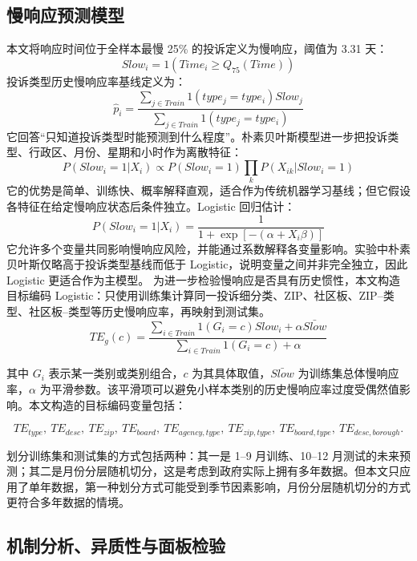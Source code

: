 \documentclass[UTF8,a4paper,12pt]{ctexart}
\begin{document}
\subsection{慢响应预测模型}

本文将响应时间位于全样本最慢 25\% 的投诉定义为慢响应，阈值为 3.31 天：
\begin{equation}
Slow_i=1(Time_i \geq Q_{75}(Time))
\end{equation}
投诉类型历史慢响应率基线定义为：
\begin{equation}
\hat p_i=\frac{\sum_{j\in Train}1(type_j=type_i)Slow_j}{\sum_{j\in Train}1(type_j=type_i)}
\end{equation}
它回答“只知道投诉类型时能预测到什么程度”。朴素贝叶斯模型进一步把投诉类型、行政区、月份、星期和小时作为离散特征：
\begin{equation}
P(Slow_i=1|X_i)\propto P(Slow_i=1)\prod_k P(X_{ik}|Slow_i=1)
\end{equation}
它的优势是简单、训练快、概率解释直观，适合作为传统机器学习基线；但它假设各特征在给定慢响应状态后条件独立。Logistic 回归估计：
\begin{equation}
P(Slow_i=1|X_i)=\frac{1}{1+\exp[-(\alpha+X_i\beta)]}
\end{equation}
它允许多个变量共同影响慢响应风险，并能通过系数解释各变量影响。实验中朴素贝叶斯仅略高于投诉类型基线而低于 Logistic，说明变量之间并非完全独立，因此 Logistic 更适合作为主模型。
为进一步检验慢响应是否具有历史惯性，本文构造目标编码 Logistic：只使用训练集计算同一投诉细分类、ZIP、社区板、ZIP--类型、社区板--类型等历史慢响应率，再映射到测试集。
\begin{equation}
TE_g(c)=
\frac{\sum_{i\in Train}1(G_i=c)Slow_i+\alpha \bar{Slow}}
{\sum_{i\in Train}1(G_i=c)+\alpha}
\end{equation}

其中 \(G_i\) 表示某一类别或类别组合，\(c\) 为其具体取值，\(\bar{Slow}\) 为训练集总体慢响应率，\(\alpha\) 为平滑参数。该平滑项可以避免小样本类别的历史慢响应率过度受偶然值影响。本文构造的目标编码变量包括：

\[
TE_{type},\ TE_{desc},\ TE_{zip},\ TE_{board},\ TE_{agency,type},\ TE_{zip,type},\ TE_{board,type},\ TE_{desc,borough}.
\]


划分训练集和测试集的方式包括两种：其一是 1--9 月训练、10--12 月测试的未来预测；其二是月份分层随机切分，这是考虑到政府实际上拥有多年数据。但本文只应用了单年数据，第一种划分方式可能受到季节因素影响，月份分层随机切分的方式更符合多年数据的情境。

\subsection{机制分析、异质性与面板检验}
\end{document}
